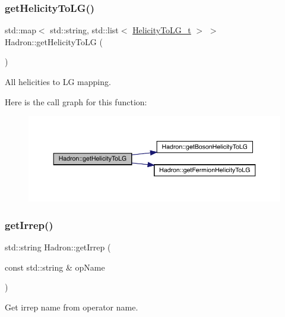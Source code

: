 \subsubsection{\texorpdfstring{getHelicityToLG()}{getHelicityToLG()}}
{\footnotesize\ttfamily std\+::map$<$ std\+::string, std\+::list$<$ \mbox{\hyperlink{structHadron_1_1HelicityToLG__t}{Helicity\+To\+L\+G\+\_\+t}} $>$ $>$ Hadron\+::get\+Helicity\+To\+LG (\begin{DoxyParamCaption}{ }\end{DoxyParamCaption})}



All helicities to LG mapping. 

Here is the call graph for this function\+:\nopagebreak
\begin{figure}[H]
\begin{center}
\leavevmode
\includegraphics[width=350pt]{d1/daf/namespaceHadron_aeab17d669da3fa4a904236091bd5384f_cgraph}
\end{center}
\end{figure}
\mbox{\label{namespaceHadron_a33d1d1e15a13f881d974049a8ae1c3dc}} 
\subsubsection{\texorpdfstring{getIrrep()}{getIrrep()}}
{\footnotesize\ttfamily std\+::string Hadron\+::get\+Irrep (\begin{DoxyParamCaption}\item[{const std\+::string \&}]{op\+Name }\end{DoxyParamCaption})}



Get irrep name from operator name. 

